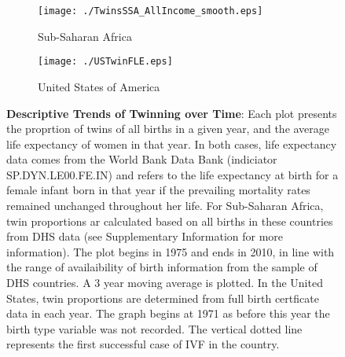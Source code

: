 \documentclass{nature}
\begin{document}
\begin{linenumbers}
\begin{spacing}{1}
\begin{figure}[htpb!]
\begin{subfigure}{.5\textwidth}
  \texttt{[image: ./TwinsSSA\_AllIncome\_smooth.eps]}
   \caption{Sub-Saharan Africa}
\end{subfigure}%
\begin{subfigure}{.5\textwidth}
  \texttt{[image: ./USTwinFLE.eps]}
  \caption{United States of America}
\end{subfigure}
\caption{\textbf{Descriptive Trends of Twinning over Time}: {\footnotesize Each plot presents the proprtion of
twins of all births in a given year, and the average life expectancy of women in that year. In
both cases, life expectancy data comes from the World Bank Data Bank (indiciator SP.DYN.LE00.FE.IN) and refers to the life expectancy at birth for a female infant born in that year if the prevailing mortality rates remained unchanged throughout her life.  For Sub-Saharan Africa, twin proportions ar calculated based on all births in these countries from DHS data (see Supplementary Information for more information).  The plot begins in 1975 and ends in 2010, in line with the range of availaibility of birth information from the sample of DHS countries.  A 3 year moving average is plotted.  In the United States, twin proportions are determined from full birth certficate data in each year.  The graph begins at 1971 as before this year the birth type variable was not recorded.  The vertical dotted line represents the first successful case of IVF in the country.}}
\end{figure}


\end{spacing}
\end{linenumbers}
\end{document}
